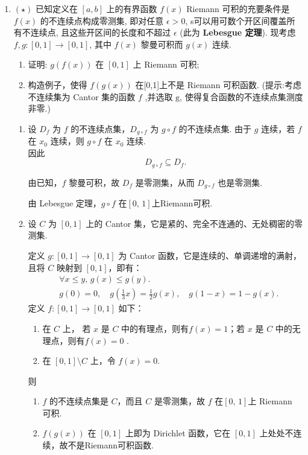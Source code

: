\begin{enumerate}
    \item[6.]$(\star)$ 已知定义在 \([a,b]\) 上的有界函数 \(f(x)\) Riemann 可积的充要条件是 \(f(x)\) 的不连续点构成零测集, 即对任意 \(\epsilon >0\), 
    s可以用可数个开区间覆盖所有不连续点, 且这些开区间的长度和不超过 \(\epsilon\) (此为 \textbf{Lebesgue 定理}). 现考虑 \(f,g:[0,1]\to [0,1]\), 其中 \(f(x)\) 黎曼可积而 \(g(x)\) 连续.
    \begin{enumerate}
        \item[(a)]证明: \(g(f(x))\) 在 $[0,1]$ 上 Riemann 可积;
        \item[(b)]构造例子，使得 \(f(g(x))\) 在[0,1]上不是 Riemann 可积函数.
        (提示:考虑不连续集为 Cantor 集的函数 \(f\) ,并选取 \(\mathrm{g}\), 使得复合函数的不连续点集测度非零.)
    \end{enumerate}
    \begin{solution}
        \begin{enumerate}
        \item[(a)]
        设 $D_f$ 为 $f$ 的不连续点集，$D_{g\circ f}$ 为 $g\circ f$ 的不连续点集.
        由于 $g$ 连续，若 $f$ 在 $x_0$ 连续，则 $g\circ f$ 在 $x_0$ 连续.\\
        因此
        \[
        D_{g\circ f} \subseteq D_f.
        \]

        由已知，$f$ 黎曼可积，故 $D_f$ 是零测集，从而 $D_{g\circ f}$ 也是零测集.

        由 Lebesgue 定理，$g\circ f$ 在$[0,\,1]$上Riemann可积. 

        \item[(b)]
        设 $C$ 为 $[0,1]$ 上的 Cantor 集，它是紧的、完全不连通的、无处稠密的零测集.

        定义 $g: [0,1] \to [0,1]$ 为 Cantor 函数，它是连续的、单调递增的满射，且将 $C$ 映射到 $[0,1]$，即有：
        \[
        \begin{aligned}
        &\forall x\leq y,\, g(x)\leq g(y).\\
        &g(0)=0,\quad g\left(\frac{1}{3}x\right)=\frac{1}{2}g(x), \quad g(1-x)=1-g(x).
        \end{aligned}
        \]
        定义 $f: [0,1] \to [0,1]$ 如下：
        \begin{enumerate}
            \item[i.] 在 $C$ 上，  若 $x$ 是 $C$ 中的有理点，则有$f(x) = 1$；若 $x$ 是 $C$ 中的无理点，则有$f(x) = 0$ .
            \item[ii.] 在 $[0,1]\setminus C$ 上，令 $f(x) = 0$.
        \end{enumerate}
        则
        \begin{enumerate}
            \item[(i)] $f$ 的不连续点集是 $C$，而且 $C$ 是零测集，故 $f$ 在$[0,\,1]$上 Riemann 可积.
            \item[(ii)] $f(g(x))$ 在 $[0,1]$ 上即为 Dirichlet 函数，它在 $[0,1]$ 上处处不连续，故不是Riemann可积函数. 
        \end{enumerate}
        \end{enumerate}
    \end{solution}
\end{enumerate}

